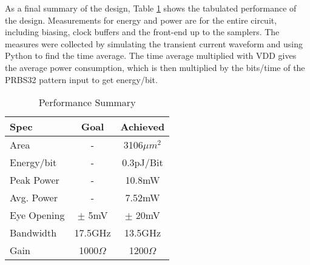 As a final summary of the design, Table \ref{Performance Summary} shows the tabulated performance of the design. Measurements for energy and power are for the entire circuit, including biasing, clock buffers and the front-end up to the samplers. The measures were collected by simulating the transient current waveform and using Python to find the time average. The time average multiplied with VDD gives the average power consumption, which is then multiplied by the bits/time of the PRBS32 pattern input to get energy/bit.
\begin{table}[h]
\centering
\begin{tabular}{|l|c|c|}
\hline
Spec        & Goal      & Achieved  \\ \hline
Area        & -         & 3106$\mu m^2$   \\ \hline
Energy/bit  & -         & 0.3pJ/Bit \\ \hline
Peak Power  & -         & 10.8mW    \\ \hline
Avg. Power  & -         & 7.52mW    \\ \hline
Eye Opening & $\pm$ 5mV  & $\pm$ 20mV  \\ \hline
Bandwidth   & 17.5GHz   & 13.5GHz   \\ \hline
Gain        & 1000$\Omega$ & 1200$\Omega$ \\ \hline
\end{tabular}
\caption{Performance Summary}
\label{Performance Summary}
\end{table}
\clearpage
